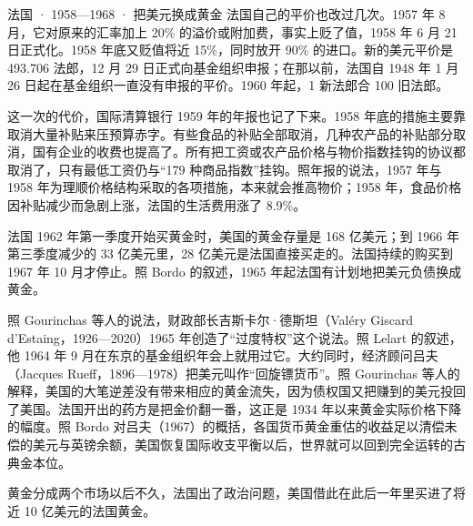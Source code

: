 \begin{case}{法国 · 1958—1968 · 把美元换成黄金}
法国自己的平价也改过几次。1957 年 8 月，它对原来的汇率加上 20\% 的溢价或附加费，事实上贬了值，1958 年 6 月 21 日正式化\cite{bis36}。1958 年底又贬值将近 15\%，同时放开 90\% 的进口\cite{bis36}。新的美元平价是 493.706 法郎，12 月 29 日正式向基金组织申报；在那以前，法国自 1948 年 1 月 26 日起在基金组织一直没有申报的平价\cite{bis36}。1960 年起，1 新法郎合 100 旧法郎\cite{bordo1993}。

这一次的代价，国际清算银行 1959 年的年报也记了下来。1958 年底的措施主要靠取消大量补贴来压预算赤字\cite{bis36}。有些食品的补贴全部取消，几种农产品的补贴部分取消，国有企业的收费也提高了\cite{bis36}。所有把工资或农产品价格与物价指数挂钩的协议都取消了，只有最低工资仍与“179 种商品指数”挂钩\cite{bis36}。照年报的说法，1957 年与 1958 年为理顺价格结构采取的各项措施，本来就会推高物价；1958 年，食品价格因补贴减少而急剧上涨，法国的生活费用涨了 8.9\%\cite{bis36}。

法国 1962 年第一季度开始买黄金时，美国的黄金存量是 168 亿美元；到 1966 年第三季度减少的 33 亿美元里，28 亿美元是法国直接买走的\cite{garber1993}。法国持续的购买到 1967 年 10 月才停止\cite{garber1993}。照 Bordo 的叙述，1965 年起法国有计划地把美元负债换成黄金\cite{bordo1993}。

照 Gourinchas 等人的说法，财政部长吉斯卡尔·德斯坦（Valéry Giscard d'Estaing，1926—2020）1965 年创造了“过度特权”这个说法\cite{gourinchas2010,loc36}。照 Lelart 的叙述，他 1964 年 9 月在东京的基金组织年会上就用过它\cite{lelart2018}。大约同时，经济顾问吕夫（Jacques Rueff，1896—1978）把美元叫作“回旋镖货币”\cite{gourinchas2010,gnd36}。照 Gourinchas 等人的解释，美国的大笔逆差没有带来相应的黄金流失，因为债权国又把赚到的美元投回了美国\cite{gourinchas2010}。法国开出的药方是把金价翻一番，这正是 1934 年以来黄金实际价格下降的幅度\cite{bordo1993}。照 Bordo 对吕夫（1967）的概括，各国货币黄金重估的收益足以清偿未偿的美元与英镑余额，美国恢复国际收支平衡以后，世界就可以回到完全运转的古典金本位\cite{bordo1993}。

黄金分成两个市场以后不久，法国出了政治问题，美国借此在此后一年里买进了将近 10 亿美元的法国黄金\cite{garber1993}。
\end{case}

